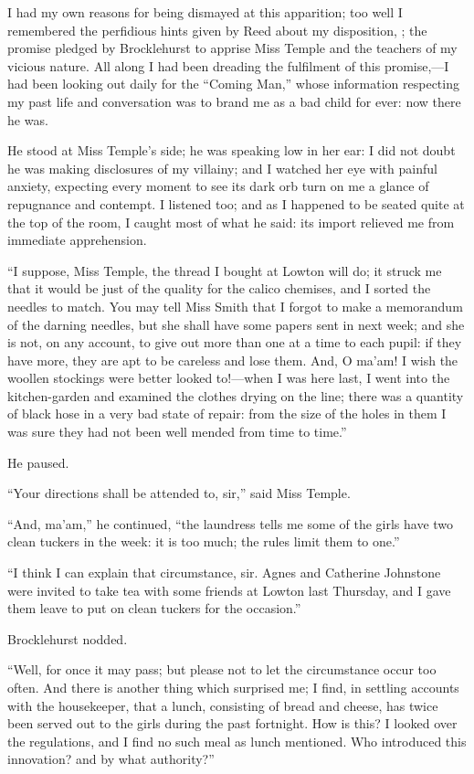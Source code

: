 I had my own reasons for being dismayed at this apparition; too well I
remembered the perfidious hints given by \Mrs{} Reed about my disposition,
\etc; the promise pledged by \Mr{} Brocklehurst to apprise Miss Temple and
the teachers of my vicious nature. All along I had been dreading the
fulfilment of this promise,---I had been looking out daily for the
\enquote{Coming Man,} whose information respecting my past life and
conversation was to brand me as a bad child for ever: now there he was.

He stood at Miss Temple's side; he was speaking low in her ear: I did
not doubt he was making disclosures of my villainy; and I watched her
eye with painful anxiety, expecting every moment to see its dark orb
turn on me a glance of repugnance and contempt. I listened too; and as
I happened to be seated quite at the top of the room, I caught most of
what he said: its import relieved me from immediate apprehension.

\enquote{I suppose, Miss Temple, the thread I bought at Lowton will do;
	it struck me that it would be just of the quality for the calico
	chemises, and I sorted the needles to match. You may tell Miss Smith
	that I forgot to make a memorandum of the darning needles, but she shall
	have some papers sent in next week; and she is not, on any account, to
	give out more than one at a time to each pupil: if they have more, they
	are apt to be careless and lose them. And, O ma'am! I wish the woollen
	stockings were better looked to!---when I was here last, I went into the
	kitchen-garden and examined the clothes drying on the line; there was a
	quantity of black hose in a very bad state of repair: from the size of
	the holes in them I was sure they had not been well mended from time to
	time.}

He paused.

\enquote{Your directions shall be attended to, sir,} said Miss Temple.

\enquote{And, ma'am,} he continued, \enquote{the laundress tells me some
	of the girls have two clean tuckers in the week: it is too much; the
	rules limit them to one.}

\enquote{I think I can explain that circumstance, sir. Agnes and
	Catherine Johnstone were invited to take tea with some friends at Lowton
	last Thursday, and I gave them leave to put on clean tuckers for the
	occasion.}

\Mr{} Brocklehurst nodded.

\enquote{Well, for once it may pass; but please not to let the
	circumstance occur too often. And there is another thing which
	surprised me; I find, in settling accounts with the housekeeper, that a
	lunch, consisting of bread and cheese, has twice been served out to the
	girls during the past fortnight. How is this? I looked over the
	regulations, and I find no such meal as lunch mentioned. Who introduced
	this innovation? and by what authority?}

